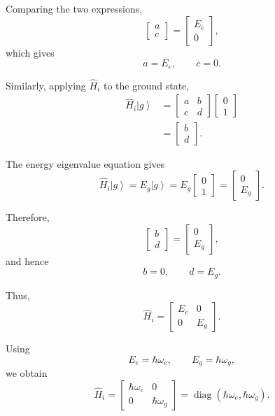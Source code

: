 \documentclass[12pt,a4paper]{article}
\newcommand{\ketg}{\left|g\right\rangle}
\begin{document}
Comparing the two expressions,
\[
\begin{bmatrix}
a\\
c
\end{bmatrix}
=
\begin{bmatrix}
E_e\\
0
\end{bmatrix},
\]
which gives
\[
a=E_e,
\qquad
c=0.
\]

Similarly, applying \(\hat H_i\) to the ground state,
\[
\begin{aligned}
\hat H_i\ketg
&=
\begin{bmatrix}
a&b\\
c&d
\end{bmatrix}
\begin{bmatrix}
0\\
1
\end{bmatrix}\\
&=
\begin{bmatrix}
b\\
d
\end{bmatrix}.
\end{aligned}
\]

The energy eigenvalue equation gives
\[
\hat H_i\ketg
=
E_g\ketg
=
E_g
\begin{bmatrix}
0\\
1
\end{bmatrix}
=
\begin{bmatrix}
0\\
E_g
\end{bmatrix}.
\]

Therefore,
\[
\begin{bmatrix}
b\\
d
\end{bmatrix}
=
\begin{bmatrix}
0\\
E_g
\end{bmatrix},
\]
and hence
\[
b=0,
\qquad
d=E_g.
\]

Thus,
\begin{equation}
\boxed{
\hat H_i
=
\begin{bmatrix}
E_e&0\\
0&E_g
\end{bmatrix}.
}
\tag{3}
\end{equation}

Using
\[
E_e=\hbar\omega_e,
\qquad
E_g=\hbar\omega_g,
\]
we obtain
\begin{equation}
\boxed{
\hat H_i
=
\begin{bmatrix}
\hbar\omega_e&0\\
0&\hbar\omega_g
\end{bmatrix}
=
\operatorname{diag}
(\hbar\omega_e,\hbar\omega_g).
}
\tag{4}
\end{equation}
\end{document}
